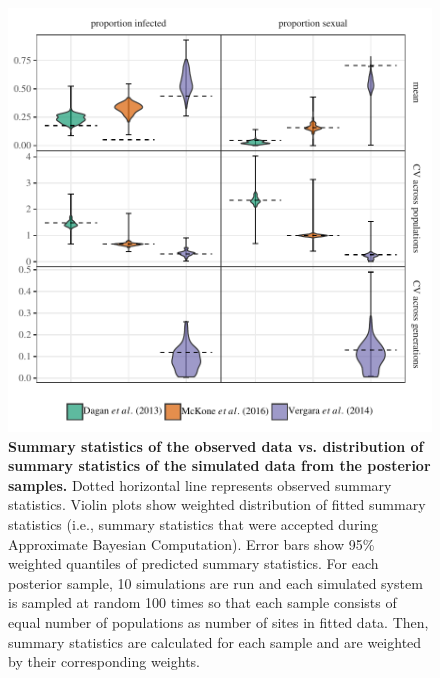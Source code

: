\documentclass{article}\usepackage[]{graphicx}\usepackage[]{color}
\begin{document}
\begin{figure}[!ht]
\includegraphics[width=\textwidth]{../fig/smc_summary.pdf}
\caption{{\bf Summary statistics of the observed data vs. distribution of summary statistics of the simulated data from the posterior samples.}
Dotted horizontal line represents observed summary statistics.
Violin plots show weighted distribution of fitted summary statistics (i.e., summary statistics that were accepted during Approximate Bayesian Computation). 
Error bars show 95\% weighted quantiles of predicted summary statistics.
For each posterior sample, 10 simulations are run and each simulated system is sampled at random 100 times so that each sample consists of equal number of populations as number of sites in fitted data. 
Then, summary statistics are calculated for each sample and are weighted by their corresponding weights.
}
\label{fig:smcsumm}
\end{figure}
\end{document}
